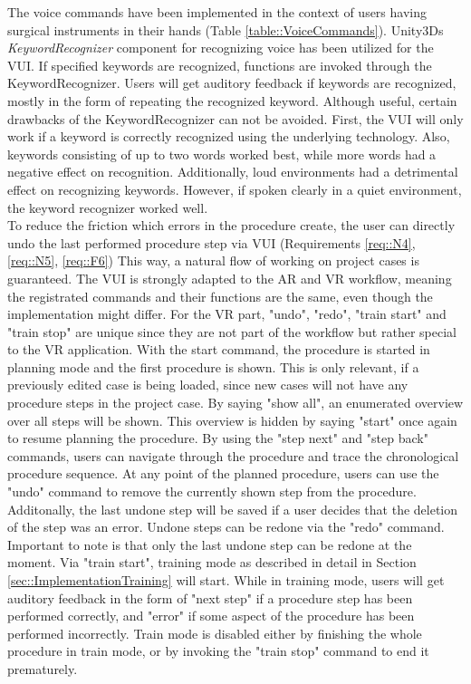 The voice commands have been implemented in the context of users having surgical instruments in their hands (Table \ref{table::VoiceCommands}).
Unity3Ds \textit{KeywordRecognizer} component for recognizing voice has been utilized for the VUI.
If specified keywords are recognized, functions are invoked through the KeywordRecognizer.
Users will get auditory feedback if keywords are recognized, mostly in the form of repeating the recognized keyword.
Although useful, certain drawbacks of the KeywordRecognizer can not be avoided.
First, the VUI will only work if a keyword is correctly recognized using the underlying technology.
Also, keywords consisting of up to two words worked best, while more words had a negative effect on recognition.
Additionally, loud environments had a detrimental effect on recognizing keywords.
However, if spoken clearly in a quiet environment, the keyword recognizer worked well.
\\ To reduce the friction which errors in the procedure create, the user can directly undo the last performed procedure step via VUI (Requirements \ref{req::N4}, \ref{req::N5}, \ref{req::F6})
This way, a natural flow of working on project cases is guaranteed.
The VUI is strongly adapted to the AR and VR workflow, meaning the registrated commands and their functions are the same, even though the implementation might differ.
For the VR part, "undo", "redo", "train start" and "train stop" are unique since they are not part of the workflow but rather special to the VR application.
With the start command, the procedure is started in planning mode and the first procedure is shown.
This is only relevant, if a previously edited case is being loaded, since new cases will not have any procedure steps in the project case.
By saying "show all", an enumerated overview over all steps will be shown. This overview is hidden by saying "start" once again to resume planning the procedure.
By using the "step next" and "step back" commands, users can navigate through the procedure and trace the chronological procedure sequence.
At any point of the planned procedure, users can use the "undo" command to remove the currently shown step from the procedure.
Additonally, the last undone step will be saved if a user decides that the deletion of the step was an error.
Undone steps can be redone via the "redo" command.
Important to note is that only the last undone step can be redone at the moment.
Via "train start", training mode as described in detail in Section \ref{sec::ImplementationTraining} will start.
While in training mode, users will get auditory feedback in the form of "next step" if a procedure step has been performed correctly, and "error" if some aspect of the procedure has 
been performed incorrectly.
Train mode is disabled either by finishing the whole procedure in train mode, or by invoking the "train stop" command to end it prematurely.